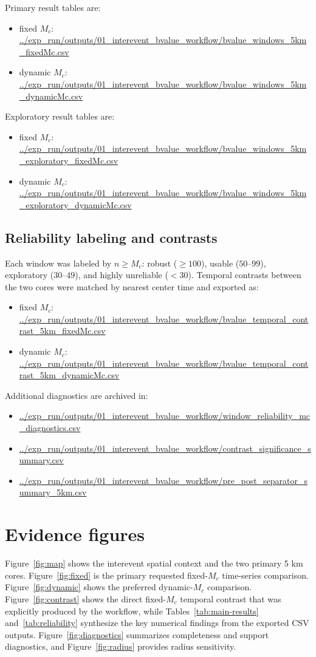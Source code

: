 \documentclass[11pt]{article}
\begin{document}
Primary result tables are:
\begin{itemize}[leftmargin=1.5em]
    \item fixed $M_c$: \url{../exp_run/outputs/01_interevent_bvalue_workflow/bvalue_windows_5km_fixedMc.csv}
    \item dynamic $M_c$: \url{../exp_run/outputs/01_interevent_bvalue_workflow/bvalue_windows_5km_dynamicMc.csv}
\end{itemize}
Exploratory result tables are:
\begin{itemize}[leftmargin=1.5em]
    \item fixed $M_c$: \url{../exp_run/outputs/01_interevent_bvalue_workflow/bvalue_windows_5km_exploratory_fixedMc.csv}
    \item dynamic $M_c$: \url{../exp_run/outputs/01_interevent_bvalue_workflow/bvalue_windows_5km_exploratory_dynamicMc.csv}
\end{itemize}

\subsection{Reliability labeling and contrasts}
Each window was labeled by $n\geq M_c$: robust ($\geq 100$), usable ($50$--$99$), exploratory ($30$--$49$), and highly unreliable ($<30$). Temporal contrasts between the two cores were matched by nearest center time and exported as:
\begin{itemize}[leftmargin=1.5em]
    \item fixed $M_c$: \url{../exp_run/outputs/01_interevent_bvalue_workflow/bvalue_temporal_contrast_5km_fixedMc.csv}
    \item dynamic $M_c$: \url{../exp_run/outputs/01_interevent_bvalue_workflow/bvalue_temporal_contrast_5km_dynamicMc.csv}
\end{itemize}
Additional diagnostics are archived in:
\begin{itemize}[leftmargin=1.5em]
    \item \url{../exp_run/outputs/01_interevent_bvalue_workflow/window_reliability_mc_diagnostics.csv}
    \item \url{../exp_run/outputs/01_interevent_bvalue_workflow/contrast_significance_summary.csv}
    \item \url{../exp_run/outputs/01_interevent_bvalue_workflow/pre_post_separator_summary_5km.csv}
\end{itemize}

\section{Evidence figures}
Figure~\ref{fig:map} shows the interevent spatial context and the two primary 5 km cores. Figure~\ref{fig:fixed} is the primary requested fixed-$M_c$ time-series comparison. Figure~\ref{fig:dynamic} shows the preferred dynamic-$M_c$ comparison. Figure~\ref{fig:contrast} shows the direct fixed-$M_c$ temporal contrast that was explicitly produced by the workflow, while Tables~\ref{tab:main-results} and~\ref{tab:reliability} synthesize the key numerical findings from the exported CSV outputs. Figure~\ref{fig:diagnostics} summarizes completeness and support diagnostics, and Figure~\ref{fig:radius} provides radius sensitivity.
\end{document}

